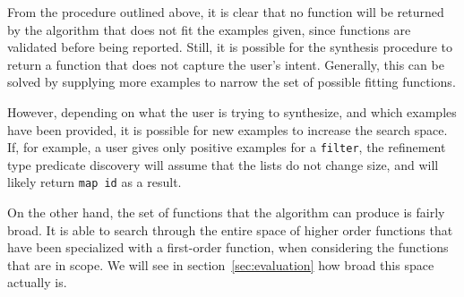 From the procedure outlined above, it is clear that no function will be returned by the algorithm that does not fit the examples given, since functions are validated before being reported. Still, it is possible for the synthesis procedure to return a function that does not capture the user's intent. Generally, this can be solved by supplying more examples to narrow the set of possible fitting functions.

However, depending on what the user is trying to synthesize, and which examples have been provided, it is possible for new examples to increase the search space. If, for example, a user gives only positive examples for a \texttt{filter}, the refinement type predicate discovery will assume that the lists do not change size, and will likely return \texttt{map id} as a result.

On the other hand, the set of functions that the algorithm can produce is fairly broad. It is able to search through the entire space of higher order functions that have been specialized with a first-order function, when considering the functions that are in scope. We will see in section~\ref{sec:evaluation} how broad this space actually is.
